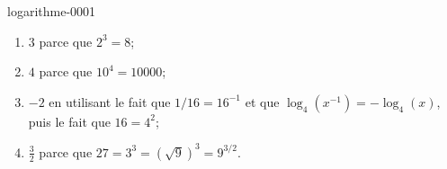 
\begin{corrige}{logarithme-0001}

	\begin{enumerate}
		\item
			$3$ parce que $2^3=8$;
		\item
			$4$ parce que $10^{4}=10000$;
		\item
			$-2$ en utilisant le fait que $1/16=16^{-1}$ et que $\log_4(x^{-1})=-\log_4(x)$, puis le fait que $16=4^2$;
		\item
			$\frac{ 3 }{ 2 }$ parce que $27=3^3=(\sqrt{9})^3=9^{3/2}$.
	\end{enumerate}

\end{corrige}
